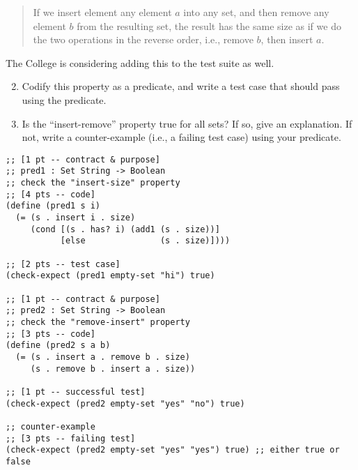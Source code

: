 \documentclass[12pt]{article}                   %
\newenvironment{solution}{}{}
\begin{document}
\begin{problem}
\begin{quote}
If we insert element any element $a$ into any set, and then remove any
element $b$ from the resulting set, the result has the same size as if
we do the two operations in the reverse order, i.e., remove $b$, then
insert $a$.
\end{quote}

\noindent
The College is considering adding this to the test suite as well.

\begin{enumerate}
\setcounter{enumi}{1}

\item Codify this property as a predicate, and write a test case that
  should pass using the predicate.

\item Is the ``insert-remove'' property true for all sets?  If so,
  give an explanation.  If not, write a counter-example (i.e., a
  failing test case) using your predicate.

\end{enumerate}

\begin{solution}
\begin{verbatim}
;; [1 pt -- contract & purpose]
;; pred1 : Set String -> Boolean
;; check the "insert-size" property
;; [4 pts -- code]
(define (pred1 s i)
  (= (s . insert i . size)
     (cond [(s . has? i) (add1 (s . size))]
           [else               (s . size)])))

;; [2 pts -- test case]
(check-expect (pred1 empty-set "hi") true)

;; [1 pt -- contract & purpose]
;; pred2 : Set String -> Boolean
;; check the "remove-insert" property
;; [3 pts -- code]
(define (pred2 s a b)
  (= (s . insert a . remove b . size)
     (s . remove b . insert a . size))

;; [1 pt -- successful test]
(check-expect (pred2 empty-set "yes" "no") true)

;; counter-example
;; [3 pts -- failing test]
(check-expect (pred2 empty-set "yes" "yes") true) ;; either true or false
\end{verbatim}
\end{solution}

\newpage
\ifrubric{}
\newpage
\fi
\end{problem}
\end{document}
